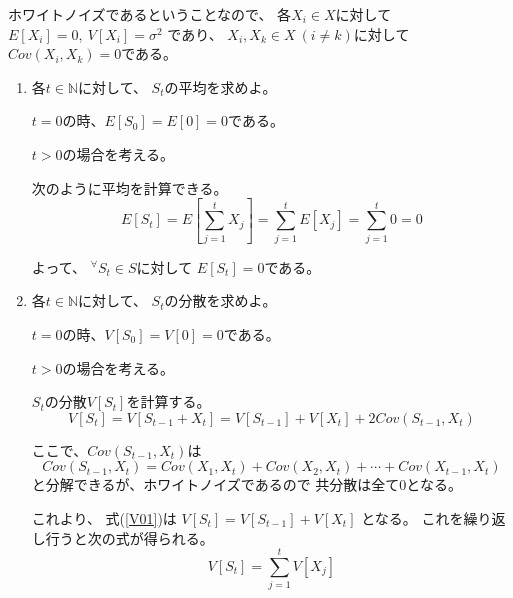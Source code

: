 \documentclass[12pt,b5paper]{ltjsarticle}
\begin{document}
\begin{enumerate}
      ホワイトノイズであるということなので、
      各$X_{i}\in X$に対して
      $E[X_{i}]=0,\ V[X_{i}]=\sigma^2$
      であり、
      $X_{i},X_{k}\in X\ (i\ne k)$に対して
      $Cov(X_{i},X_{k})=0$である。

      \hrulefill
      \begin{enumerate}
       \item
            各$t\in\mathbb{N}$に対して、
            $S_{t}$の平均を求めよ。

\dotfill

            $t=0$の時、$E[S_0]=E[0]=0$である。

            $t>0$の場合を考える。

            次のように平均を計算できる。
            \begin{equation}
             E[S_{t}]
              =E\left[\sum_{j=1}^{t}X_{j}\right]
              =\sum_{j=1}^{t} E[X_{j}]
              =\sum_{j=1}^{t} 0
              =0
            \end{equation}

            よって、
            ${}^{\forall}S_{t}\in S$に対して
            $E[S_{t}]=0$である。

\hrulefill

       \item
            各$t\in\mathbb{N}$に対して、
            $S_{t}$の分散を求めよ。

\dotfill

            $t=0$の時、$V[S_0]=V[0]=0$である。

            $t>0$の場合を考える。

            $S_{t}$の分散$V[S_{t}]$を計算する。
            \begin{equation}
             V[S_{t}]
              =V[S_{t-1}+X_{t}]
              =V[S_{t-1}]+V[X_{t}]+2Cov(S_{t-1},X_{t})
              \label{V01}
            \end{equation}

            ここで、$Cov(S_{t-1},X_{t})$は
            \begin{equation}
             Cov(S_{t-1},X_{t})
              =Cov(X_{1},X_{t})+Cov(X_{2},X_{t})
              + \cdots +Cov(X_{t-1},X_{t})
            \end{equation}
            と分解できるが、ホワイトノイズであるので
            共分散は全て0となる。

            これより、
            式(\ref{V01})は
            $V[S_{t}]=V[S_{t-1}]+V[X_{t}]$
            となる。
            これを繰り返し行うと次の式が得られる。
            \begin{equation}
             V[S_{t}]=\sum_{j=1}^{t}V[X_{j}]
            \end{equation}


\end{enumerate}
\end{enumerate}
\end{document}
